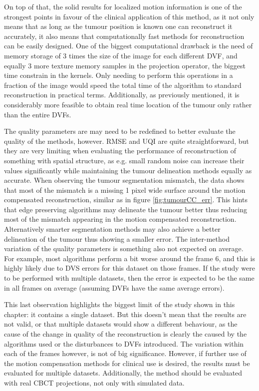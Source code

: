 On top of that, the solid results for localized motion information is one of the strongest points in favour of the clinical application of this method, as it not only means that as long as the tumour position is known one can reconstruct it accurately, it also means that computationally fast methods for reconstruction can be easily designed. One of the biggest computational drawback is the need of memory storage of 3 times the size of the image for each different DVF, and equally 3 more texture memory samples in the projection operator, the biggest time constrain in the kernels. Only needing to perform this operations in a fraction of the image would speed the total time of the algorithm to  standard reconstruction in practical terms. Additionally, as previously mentioned, it is considerably more feasible to obtain real time location of the tumour only rather than the entire DVFs. 

The quality parameters are may need to be redefined to better evaluate the quality of the methods, however. RMSE and UQI are quite straightforward, but they are very limiting when evaluating the performance of reconstruction of something with spatial structure, as e.g. small random noise can increase their values significantly while maintaining the tumour delineation methods equally as accurate. When observing the tumour segmentation mismatch, the data shows that most of the mismatch is a missing 1 pixel wide surface around the motion compensated reconstruction, similar as in figure \ref{fig:tumourCC_err}. This hints that edge preserving algorithms may delineate the tumour better thus reducing most of the mismatch appearing in the motion compensated reconstruction. Alternatively smarter segmentation methods may also achieve a better delineation of the tumour thus showing a smaller error. The inter-method variation of the quality parameters is something also not expected on average. For example, most algorithms perform a bit worse around the frame 6, and this is highly likely due to DVS errors for this dataset on those frames. If the study were to be performed with multiple datasets, then the error is expected to be the same in all frames on average (assuming DVFs have the same average errors). 

This last observation highlights the biggest limit of the study shown in this chapter: it contains a single dataset. But this doesn't mean that the results are not valid, or that multiple datasets would show a different behaviour, as the cause of the change in quality of the reconstruction is clearly the caused by the algorithms used or the disturbances to DVFs introduced. The variation within each of the frames however, is not of big significance. However, if further use of the motion compensation methods for clinical use is desired, the results must be evaluated for multiple datasets. Additionally, the method should be evaluated with real CBCT projections, not only with simulated data.

